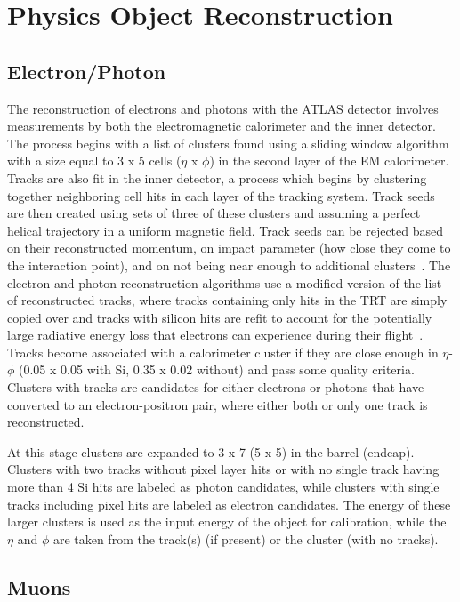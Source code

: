 \chapter{Physics Object Reconstruction}
\label{Reco}

\section{Electron/Photon}
\label{EMReco}
The reconstruction of electrons and photons with the ATLAS detector involves measurements by both the electromagnetic calorimeter and the inner detector.  
The process begins with a list of clusters found using a sliding window algorithm with a size equal to 3 x 5 cells ($\eta$ x $\phi$) in the second layer of the EM calorimeter.  
Tracks are also fit in the inner detector, a process which begins by clustering together neighboring cell hits in each layer of the tracking system.  
Track seeds are then created using sets of three of these clusters and assuming a perfect helical trajectory in a uniform magnetic field.  
Track seeds can be rejected based on their reconstructed momentum, on impact parameter (how close they come to the interaction point), and on not being near enough to additional clusters~\cite{Aaboud:2017all}.  
The electron and photon reconstruction algorithms use a modified version of the list of reconstructed tracks, where tracks containing only hits in the TRT are simply copied over and tracks with silicon hits are refit to account for the potentially large radiative energy loss that electrons can experience during their flight~\cite{ATLAS-CONF-2012-047}.  
Tracks become associated with a calorimeter cluster if they are close enough in $\eta$-$\phi$ (0.05 x 0.05 with Si, 0.35 x 0.02 without) and pass some quality criteria.  
Clusters with tracks are candidates for either electrons or photons that have converted to an electron-positron pair, where either both or only one track is reconstructed.  

At this stage clusters are expanded to 3 x 7 (5 x 5) in the barrel (endcap).  
Clusters with two tracks without pixel layer hits or with no single track having more than 4 Si hits are labeled as photon candidates, while clusters with single tracks including pixel hits are labeled as electron candidates.  
The energy of these larger clusters is used as the input energy of the object for calibration, while the $\eta$ and $\phi$ are taken from the track(s) (if present) or the cluster (with no tracks).  

\section{Muons}
\label{Muons}

